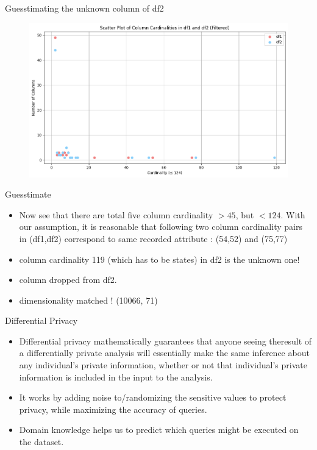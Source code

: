 \documentclass{beamer}
\begin{document}
\begin{frame}{Guesstimating the unknown column of df2}
\begin{figure}
    \centering
    \includegraphics[width=1.0\textwidth]{slide_image/scat_col.png}
\end{figure}
\end{frame}

\begin{frame}{Guesstimate}
\begin{itemize}
    \item Now see that there are total five column cardinality $> 45$, but $< 124$. With our assumption, it is reasonable that following two column cardinality pairs in (df1,df2) correspond to same recorded attribute : (54,52) and (75,77)
    \item column cardinality 119 (which has to be states) in df2 is the unknown one!
    \item column dropped from df2.
    \item dimensionality matched ! (10066, 71)
\end{itemize}
\end{frame}

\begin{frame}{Differential Privacy}
\begin{itemize}
    \item Differential privacy mathematically guarantees that anyone seeing theresult of a differentially private analysis will essentially make the same
inference about any individual’s private information, whether or not that
individual’s private information is included in the input to the analysis.
    \item It works by adding noise to/randomizing the sensitive
values to protect privacy, while maximizing the accuracy
of queries.
\item Domain knowledge helps us to predict which queries might be executed on the dataset.
\end{itemize}
\end{frame}
\end{document}
